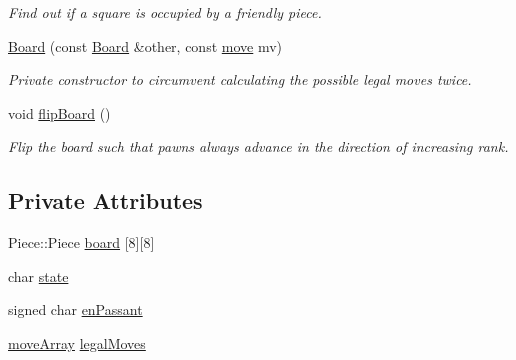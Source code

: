 \begin{DoxyCompactItemize}
\begin{DoxyCompactList}\small\item\em Find out if a square is occupied by a friendly piece. \end{DoxyCompactList}\item 
\hyperlink{classBoard_a632d2e0f09a1ad6fe835dc11ef1238cc}{Board} (const \hyperlink{classBoard}{Board} \&other, const \hyperlink{structmove}{move} mv)
\begin{DoxyCompactList}\small\item\em Private constructor to circumvent calculating the possible legal moves twice. \end{DoxyCompactList}\item 
void \hyperlink{classBoard_aeea5a9ddcdeb6e4c087f53e71f6c11ec}{flip\+Board} ()
\begin{DoxyCompactList}\small\item\em Flip the board such that pawns always advance in the direction of increasing rank. \end{DoxyCompactList}\end{DoxyCompactItemize}
\subsection*{Private Attributes}
\begin{DoxyCompactItemize}
\item 
Piece\+::\+Piece \hyperlink{classBoard_acdbd7620b4c8bc08b2e42623c2a12a39}{board} \mbox{[}8\mbox{]}\mbox{[}8\mbox{]}
\item 
char \hyperlink{classBoard_a46a6e23b1b18542b10938f2b333862f1}{state}
\item 
signed char \hyperlink{classBoard_aad3145585c03f739311c35fa8f3277d3}{en\+Passant}
\item 
\hyperlink{structmoveArray}{move\+Array} \hyperlink{classBoard_aaf6a2575c3bc280ddc9e445efd213e14}{legal\+Moves}
\end{DoxyCompactItemize}


